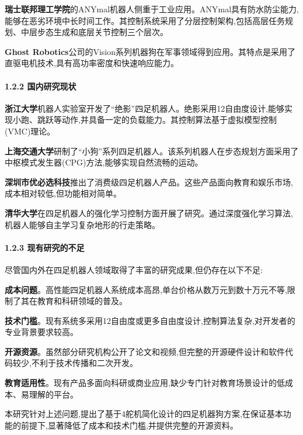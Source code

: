 \documentclass[
]{article}
\begin{document}
\textbf{瑞士联邦理工学院}的ANYmal机器人侧重于工业应用。ANYmal具有防水防尘能力,能够在恶劣环境中长时间工作。其控制系统采用了分层控制架构,包括高层任务规划、中层步态生成和底层关节控制三个层次。

\textbf{Ghost
Robotics}公司的Vision系列机器狗在军事领域得到应用。其特点是采用了直驱电机技术,具有高功率密度和快速响应能力。

\hypertarget{ux56fdux5185ux7814ux7a76ux73b0ux72b6}{%
\paragraph{1.2.2
国内研究现状}\label{ux56fdux5185ux7814ux7a76ux73b0ux72b6}}

\textbf{浙江大学}机器人实验室开发了``绝影''四足机器人。绝影采用12自由度设计,能够实现小跑、跳跃等动作,并具备一定的负载能力。其控制算法基于虚拟模型控制(VMC)理论。

\textbf{上海交通大学}研制了``小狗''系列四足机器人。该系列机器人在步态规划方面采用了中枢模式发生器(CPG)方法,能够实现自然流畅的运动。

\textbf{深圳市优必选科技}推出了消费级四足机器人产品。这些产品面向教育和娱乐市场,成本相对较低,但功能相对简单。

\textbf{清华大学}在四足机器人的强化学习控制方面开展了研究。通过深度强化学习算法,机器人能够自主学习复杂地形的行走策略。

\hypertarget{ux73b0ux6709ux7814ux7a76ux7684ux4e0dux8db3}{%
\paragraph{1.2.3
现有研究的不足}\label{ux73b0ux6709ux7814ux7a76ux7684ux4e0dux8db3}}

尽管国内外在四足机器人领域取得了丰富的研究成果,但仍存在以下不足:

\textbf{成本问题}。高性能四足机器人系统成本高昂,单台价格从数万元到数十万元不等,限制了其在教育和科研领域的普及。

\textbf{技术门槛}。现有系统多采用12自由度或更多自由度设计,控制算法复杂,对开发者的专业背景要求较高。

\textbf{开源资源}。虽然部分研究机构公开了论文和视频,但完整的开源硬件设计和软件代码较少,不利于技术传播和二次开发。

\textbf{教育适用性}。现有产品多面向科研或商业应用,缺少专门针对教育场景设计的低成本、易理解的平台。

本研究针对上述问题,提出了基于4舵机简化设计的四足机器狗方案,在保证基本功能的前提下,显著降低了成本和技术门槛,并提供完整的开源资料。
\end{document}
